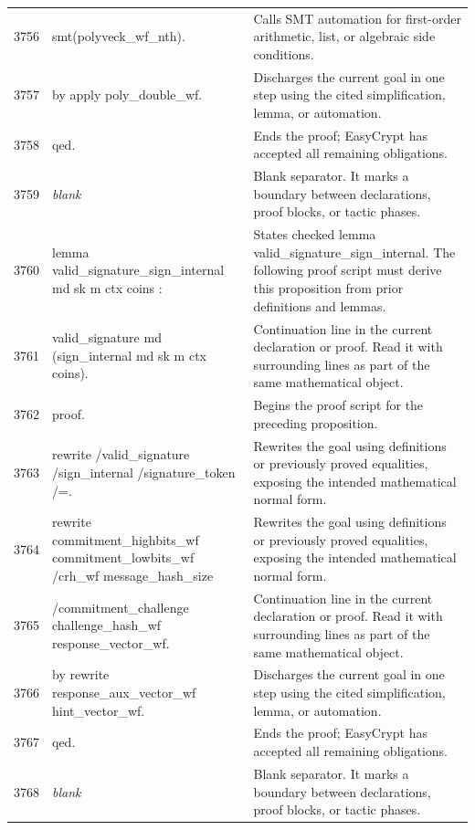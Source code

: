 \documentclass[10pt]{article}
\begin{document}
\begin{longtable}{r L{0.53\textwidth} L{0.37\textwidth}}
3756 & {\ttfamily\scriptsize   smt(polyveck\_wf\_nth).} & Calls SMT automation for first-order arithmetic, list, or algebraic side conditions. \\
3757 & {\ttfamily\scriptsize by apply poly\_double\_wf.} & Discharges the current goal in one step using the cited simplification, lemma, or automation. \\
3758 & {\ttfamily\scriptsize qed.} & Ends the proof; EasyCrypt has accepted all remaining obligations. \\
3759 & {\ttfamily\scriptsize \emph{blank}} & Blank separator.  It marks a boundary between declarations, proof blocks, or tactic phases. \\
3760 & {\ttfamily\scriptsize lemma valid\_signature\_sign\_internal md sk m ctx coins :} & States checked lemma valid\_signature\_sign\_internal.  The following proof script must derive this proposition from prior definitions and lemmas. \\
3761 & {\ttfamily\scriptsize   valid\_signature md (sign\_internal md sk m ctx coins).} & Continuation line in the current declaration or proof.  Read it with surrounding lines as part of the same mathematical object. \\
3762 & {\ttfamily\scriptsize proof.} & Begins the proof script for the preceding proposition. \\
3763 & {\ttfamily\scriptsize rewrite /valid\_signature /sign\_internal /signature\_token /=.} & Rewrites the goal using definitions or previously proved equalities, exposing the intended mathematical normal form. \\
3764 & {\ttfamily\scriptsize rewrite commitment\_highbits\_wf commitment\_lowbits\_wf /crh\_wf message\_hash\_size} & Rewrites the goal using definitions or previously proved equalities, exposing the intended mathematical normal form. \\
3765 & {\ttfamily\scriptsize         /commitment\_challenge challenge\_hash\_wf response\_vector\_wf.} & Continuation line in the current declaration or proof.  Read it with surrounding lines as part of the same mathematical object. \\
3766 & {\ttfamily\scriptsize by rewrite response\_aux\_vector\_wf hint\_vector\_wf.} & Discharges the current goal in one step using the cited simplification, lemma, or automation. \\
3767 & {\ttfamily\scriptsize qed.} & Ends the proof; EasyCrypt has accepted all remaining obligations. \\
3768 & {\ttfamily\scriptsize \emph{blank}} & Blank separator.  It marks a boundary between declarations, proof blocks, or tactic phases. \\

\end{longtable}
\end{document}
